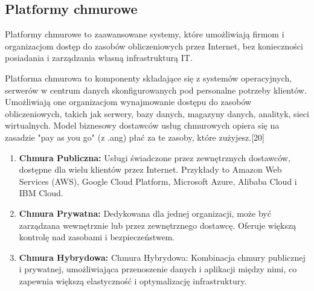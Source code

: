 \subsection{Platformy chmurowe}
Platformy chmurowe to zaawansowane systemy, które umożliwiają firmom i organizacjom dostęp do zasobów obliczeniowych przez Internet, bez konieczności posiadania i zarządzania własną infrastrukturą IT.

Platforma chmurowa to komponenty składające się z systemów operacyjnych, serwerów w centrum danych skonfigurowanych pod personalne potrzeby klientów. Umożliwiają one organizacjom wynajmowanie dostępu do zasobów obliczeniowych, takich jak serwery, bazy danych, magazyny danych, analityk, sieci wirtualnych. Model biznesowy dostawców usług chmurowych opiera się na zasadzie "pay as you go" (z .ang) płać za te zasoby, które zużyjesz.[20]
\\


\begin{enumerate}
    \item {\bf Chmura Publiczna:} Usługi świadczone przez zewnętrznych dostawców, dostępne dla wielu klientów przez Internet. Przykłady to Amazon Web Services (AWS), Google Cloud Platform, Microsoft Azure, Alibaba Cloud i IBM Cloud.
    \item {\bf  Chmura Prywatna:} Dedykowana dla jednej organizacji, może być zarządzana wewnętrznie lub przez zewnętrznego dostawcę. Oferuje większą kontrolę nad zasobami i bezpieczeństwem.
    \item {\bf Chmura Hybrydowa:} Chmura Hybrydowa: Kombinacja chmury publicznej i prywatnej, umożliwiająca przenoszenie danych i aplikacji między nimi, co zapewnia większą elastyczność i optymalizację infrastruktury.
\end{enumerate} 

